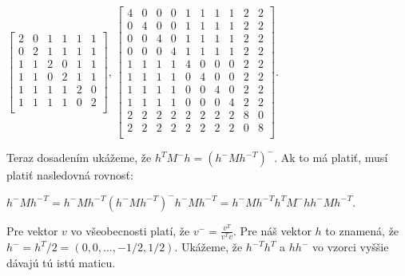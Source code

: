 \begin{dokaz}
\begin{center}
$
\begin{bmatrix}
2 & 0 & 1 & 1 & 1 & 1 \\
0 & 2 & 1 & 1 & 1 & 1 \\
1 & 1 & 2 & 0 & 1 & 1 \\
1 & 1 & 0 & 2 & 1 & 1 \\
1 & 1 & 1 & 1 & 2 & 0 \\
1 & 1 & 1 & 1 & 0 & 2 \\
\end{bmatrix}
$,
$
\begin{bmatrix}
4 & 0 & 0 & 0 & 1 & 1 & 1 & 1 & 2 & 2 \\
0 & 4 & 0 & 0 & 1 & 1 & 1 & 1 & 2 & 2 \\
0 & 0 & 4 & 0 & 1 & 1 & 1 & 1 & 2 & 2 \\
0 & 0 & 0 & 4 & 1 & 1 & 1 & 1 & 2 & 2 \\
1 & 1 & 1 & 1 & 4 & 0 & 0 & 0 & 2 & 2 \\
1 & 1 & 1 & 1 & 0 & 4 & 0 & 0 & 2 & 2 \\
1 & 1 & 1 & 1 & 0 & 0 & 4 & 0 & 2 & 2 \\
1 & 1 & 1 & 1 & 0 & 0 & 0 & 4 & 2 & 2 \\
2 & 2 & 2 & 2 & 2 & 2 & 2 & 2 & 8 & 0 \\
2 & 2 & 2 & 2 & 2 & 2 & 2 & 2 & 0 & 8 \\
\end{bmatrix}
$.
\end{center}

Teraz dosadením ukážeme, že $h^T M^- h = (h^- M {h^-}^T)^-$. Ak to má platiť, musí platiť nasledovná rovnosť:

\begin{center}
$
h^- M {h^-}^T = h^- M {h^-}^T (h^- M {h^-}^T)^- h^- M {h^-}^T = h^- M {h^-}^T h^T M^- h h^- M {h^-}^T
$.
\end{center}

Pre vektor $v$ vo všeobecnosti platí, že $v^- = \frac{v^T}{v^T v}$. Pre náš vektor $h$ to znamená, že $h^- = h^T/2 = (0, 0, \ldots, -1/2, 1/2)$.
Ukážeme, že ${h^-}^T h^T$ a $h h^-$ vo vzorci vyššie dávajú tú istú maticu.


\end{dokaz}
